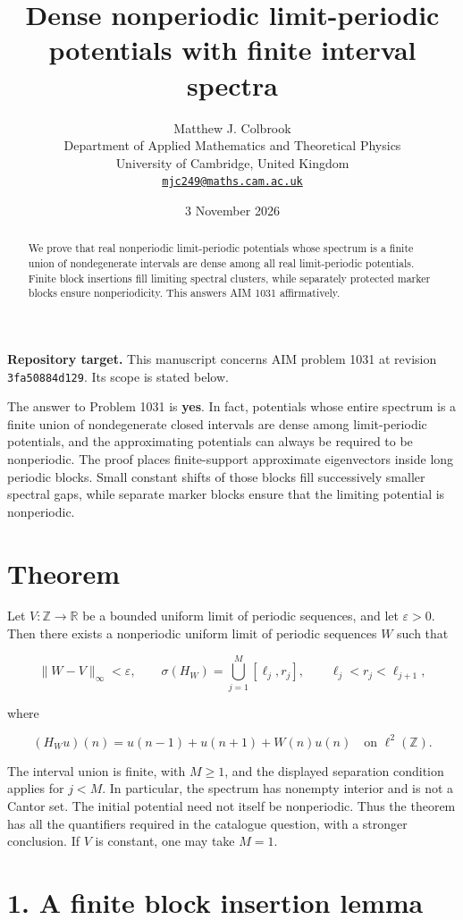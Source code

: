 \documentclass[11pt,a4paper]{article}
\title{\textbf{Dense nonperiodic limit-periodic potentials with finite interval spectra}}
\author{Matthew J. Colbrook\\[3pt]
{\small Department of Applied Mathematics and Theoretical Physics}\\
{\small University of Cambridge, United Kingdom}\\
{\small\href{mailto:mjc249@maths.cam.ac.uk}{\texttt{mjc249@maths.cam.ac.uk}}}}
\date{3 November 2026}
\begin{document}
\maketitle
\begin{abstract}
We prove that real nonperiodic limit-periodic potentials whose spectrum is a finite union of nondegenerate intervals are dense among all real limit-periodic potentials. Finite block insertions fill limiting spectral clusters, while separately protected marker blocks ensure nonperiodicity. This answers AIM 1031 affirmatively.
\end{abstract}
\noindent\textbf{Repository target.}
This manuscript concerns AIM problem 1031 at revision
\texttt{3fa50884d129}. Its scope is stated below.
\medskip

The answer to Problem 1031 is \textbf{yes}. In fact, potentials whose
entire spectrum is a finite union of nondegenerate closed intervals are
dense among limit-periodic potentials, and the approximating potentials
can always be required to be nonperiodic. The proof places
finite-support approximate eigenvectors inside long periodic blocks.
Small constant shifts of those blocks fill successively smaller spectral
gaps, while separate marker blocks ensure that the limiting potential is
nonperiodic.

\hypertarget{1031-theorem}{%
\section{Theorem}\label{1031-theorem}}

Let \(V:\mathbb Z\to\mathbb R\) be a bounded uniform limit of periodic
sequences, and let \(\varepsilon>0\). Then there exists a nonperiodic
uniform limit of periodic sequences \(W\) such that

\[
\|W-V\|_\infty<\varepsilon,
\qquad
\sigma(H_W)=\bigcup_{j=1}^{M}[\ell_j,r_j],
\qquad \ell_j<r_j<\ell_{j+1},
\]

where

\[
(H_Wu)(n)=u(n-1)+u(n+1)+W(n)u(n)
\quad\text{on }\ell^2(\mathbb Z).
\]

The interval union is finite, with \(M\geq1\), and the displayed
separation condition applies for \(j<M\). In particular, the spectrum
has nonempty interior and is not a Cantor set. The initial potential
need not itself be nonperiodic. Thus the theorem has all the quantifiers
required in the catalogue question, with a stronger conclusion. If \(V\)
is constant, one may take \(M=1\).

\hypertarget{1031-a-finite-block-insertion-lemma}{%
\section{1. A finite block insertion
lemma}\label{1031-a-finite-block-insertion-lemma}}
\end{document}
